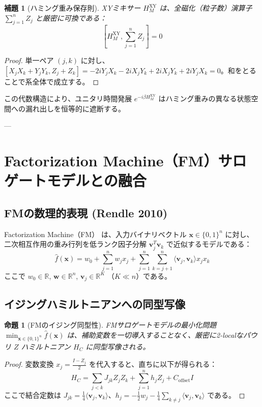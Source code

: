 \documentclass[11pt,a4paper]{ltjsarticle}
\theoremstyle{definition}
\theoremstyle{plain}
\newtheorem{lemma}[theorem]{補題}
\newtheorem{proposition}[theorem]{命題}
\theoremstyle{remark}
\begin{document}
\begin{lemma}[ハミング重み保存則]
XYミキサー $H_M^{\text{XY}}$ は、全磁化（粒子数）演算子 $\sum_{j=1}^n Z_j$ と厳密に可換である：
\begin{equation}
\left[ H_M^{\text{XY}}, \sum_{j=1}^n Z_j \right] = 0
\end{equation}
\end{lemma}
\begin{proof}
単一ペア $(j, k)$ に対し、$[X_j X_k + Y_j Y_k, Z_j + Z_k] = -2i Y_j X_k - 2i X_j Y_k + 2i X_j Y_k + 2i Y_j X_k = 0$。和をとることで系全体で成立する。
\end{proof}

この代数構造により、ユニタリ時間発展 $e^{-i\beta H_M^{\text{XY}}}$ はハミング重みの異なる状態空間への漏れ出しを恒等的に遮断する。

---

\section{Factorization Machine（FM）サロゲートモデルとの融合}

\subsection{FMの数理的表現 (Rendle 2010)}
Factorization Machine（FM）\cite{rendle2010factorization} は、入力バイナリベクトル $\bm{x} \in \{0, 1\}^n$ に対し、二次相互作用の重み行列を低ランク因子分解 $\bm{v}_j^T \bm{v}_k$ で近似するモデルである：
\begin{equation}
\hat{f}(\bm{x}) = w_0 + \sum_{j=1}^n w_j x_j + \sum_{j=1}^n \sum_{k=j+1}^n \langle \bm{v}_j, \bm{v}_k \rangle x_j x_k
\end{equation}
ここで $w_0 \in \mathbb{R}$, $\bm{w} \in \mathbb{R}^n$, $\bm{v}_j \in \mathbb{R}^K$ （$K \ll n$）である。

\subsection{イジングハミルトニアンへの同型写像}
\begin{proposition}[FMのイジング同型性]
FMサロゲートモデルの最小化問題 $\min_{\bm{x} \in \{0, 1\}^n} \hat{f}(\bm{x})$ は、補助変数を一切導入することなく、厳密に2-localなパウリ $Z$ ハミルトニアン $H_C$ に同型写像される。
\end{proposition}
\begin{proof}
変数変換 $x_j = \frac{I - Z_j}{2}$ を代入すると、直ちに以下が得られる：
\begin{equation}
H_C = \sum_{j < k} J_{jk} Z_j Z_k + \sum_{j=1}^n h_j Z_j + C_{\text{offset}} I
\end{equation}
ここで結合定数は $J_{jk} = \frac{1}{4} \langle \bm{v}_j, \bm{v}_k \rangle$、$h_j = -\frac{1}{2} w_j - \frac{1}{4} \sum_{k \neq j} \langle \bm{v}_j, \bm{v}_k \rangle$ である。
\end{proof}
\end{document}
